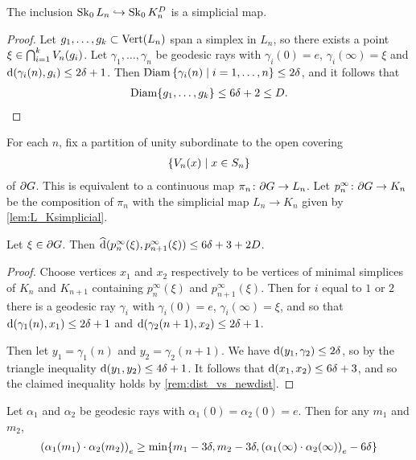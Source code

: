\documentclass[a4paper]{article}
\begin{document}
\begin{lemma}\label{lem:L_Ksimplicial}
  The inclusion $\Skel_0 L_n \into \Skel_0 K_n^D$ is a simplicial map.
\end{lemma}

\begin{proof}
  Let $g_1, \dotsc, g_k \subset \Vertices(L_n)$ span a simplex in $L_n$, so 
  there exists a point $\xi \in \bigintersection_{i=1}^k V_n(g_i)$.  Let
  $\gamma_1, \dotsc, \gamma_n$ be geodesic rays with $\gamma_i(0) = e$,
  $\gamma_i(\infty) = \xi$ and $\dist(\gamma_i(n), g_i) \leq 2\delta+1$.
  Then $\Diam\set{\gamma_i(n) \suchthat i=1, \dotsc, n} \leq 2\delta$, and it
  follows that
  \begin{align*}
    \Diam\{g_1, \dotsc, g_k\} \leq 6\delta+ 2 \leq D.\qedhere
  \end{align*}
\end{proof}

For each $n$, fix a partition of unity subordinate to the open covering 
\begin{align*}
  \set{V_n(x) \suchthat x \in S_n}
\end{align*} 
of $\boundary G$. This is equivalent to a continuous map $\pi_n \from \boundary
G \to L_n$. Let $p^\infty_n\from\boundary G\to K_n$ be the composition of
$\pi_n$ with the simplicial map $L_n \to K_n$ given by
\cref{lem:L_Ksimplicial}.

\begin{lemma}\label{lem:close_projections}
  Let $\xi \in \boundary G$. Then $\newdist(p^\infty_n(\xi),
  p^\infty_{n+1}(\xi)) \leq 6\delta+3 + 2D$.
\end{lemma}

\begin{proof}
  Choose vertices $x_1$ and $x_2$ respectively to be vertices of minimal
  simplices of $K_n$ and $K_{n+1}$ containing $p^\infty_n(\xi)$ and
  $p^\infty_{n+1}(\xi)$. Then for $i$ equal to $1$ or $2$ there is a geodesic
  ray $\gamma_i$ with $\gamma_i(0) = e$, $\gamma_i(\infty) = \xi$, and so that
  $\dist(\gamma_1(n), x_1) \leq 2\delta+1$ and $\dist(\gamma_2(n+1),
  x_2) \leq 2\delta+1$.

  Then let $y_1 = \gamma_1(n)$ and $y_2 = \gamma_2(n+1)$. We have
  $\dist(y_1, \gamma_2) \leq 2\delta$, so by the triangle inequality
  $\dist(y_1, y_2) \leq 4\delta +1$. It follows that $\dist(x_1, x_2)
  \leq 6\delta+3$, and so the claimed inequality holds by
  \cref{rem:dist_vs_newdist}.
\end{proof}

\begin{lemma}\label{lem:boundary_gromov_product}
  Let $\alpha_1$ and $\alpha_2$ be geodesic rays with $\alpha_1(0) =
  \alpha_2(0) = e$. Then for any $m_1$ and $m_2$,
  \begin{align*}
    \gromov{e}{\alpha_1(m_1)}{\alpha_2(m_2)} \geq 
        \min\{m_1 - 3\delta, m_2 - 3\delta, \gromov{e}{\alpha_1(\infty)}{\alpha_2(\infty)} - 6\delta\}
  \end{align*}
\end{lemma}
\end{document}

